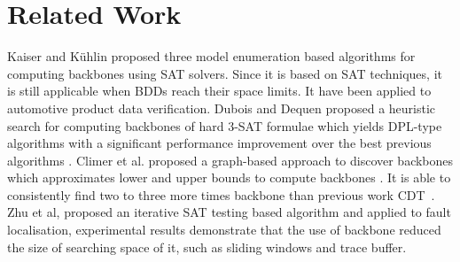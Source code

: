 \section{Related Work}\label{sec:relw}

Kaiser and K\"{u}hlin proposed three model enumeration based algorithms for computing backbones \cite{KKW2001} using SAT solvers. Since it is based on SAT techniques, it is still applicable when BDDs reach their space limits. It have been applied to automotive product data verification.
%
Dubois and Dequen proposed a heuristic search for computing backbones of hard 3-SAT formulae which yields DPL-type algorithms with a significant performance improvement over the best previous algorithms \cite{DD2001}.
Climer et al. proposed a graph-based approach to discover backbones which approximates lower and upper bounds to compute backbones \cite{CZ2002}. It is able to consistently find two to three more times backbone than previous work CDT~\cite{CDT1995}.%
%
%
Zhu et al, proposed an iterative SAT testing based algorithm \cite{ZWSM11,ZWM11} and applied to fault localisation, experimental results demonstrate that the use of backbone reduced the size of searching space of it, such as sliding windows and trace buffer. 

